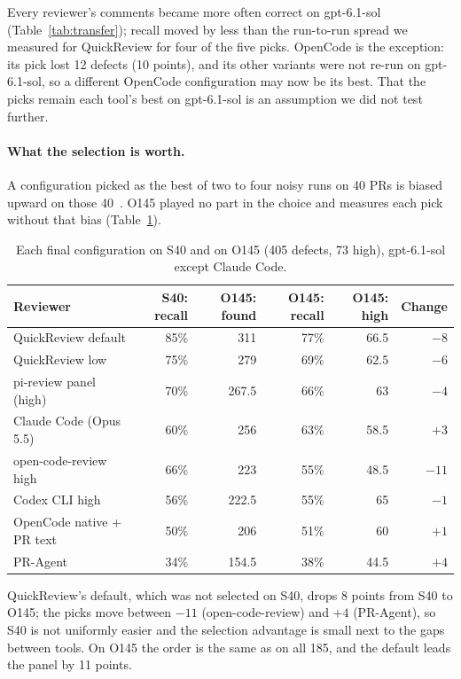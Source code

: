 \documentclass[11pt,a4paper]{article}
\newcommand{\qcr}{QuickReview}
\begin{document}
Every reviewer's comments became more often correct on gpt-6.1-sol
(Table~\ref{tab:transfer}); recall moved by less than the run-to-run spread
we measured for \qcr{} for four of the five picks. OpenCode is the
exception: its pick lost 12 defects (10 points), and its other variants
were not re-run on gpt-6.1-sol, so a different OpenCode configuration may
now be its best. That the picks remain each tool's best on gpt-6.1-sol is
an assumption we did not test further.

\paragraph{What the selection is worth.}
\label{sec:selection}
A configuration picked as the best of two to four noisy runs on 40 PRs is
biased upward on those 40~\cite{cawley2010}. O145 played no part in the
choice and measures each pick without that bias
(Table~\ref{tab:selection}).

\begin{table}[tbp]
  \centering
  \small
  \caption{Each final configuration on S40 and on
  O145 (405 defects, 73 high), gpt-6.1-sol except Claude Code.}
  \label{tab:selection}
  \begin{tabular}{lrrrrr}
    \toprule
    Reviewer & S40: recall & O145: found & O145: recall & O145: high & Change \\
    \midrule
    \qcr{} default & 85\% & 311 & 77\% & 66.5 & $-8$ \\
    \qcr{} low & 75\% & 279 & 69\% & 62.5 & $-6$ \\
    pi-review panel (high) & 70\% & 267.5 & 66\% & 63 & $-4$ \\
    Claude Code (Opus 5.5) & 60\% & 256 & 63\% & 58.5 & $+3$ \\
    open-code-review high & 66\% & 223 & 55\% & 48.5 & $-11$ \\
    Codex CLI high & 56\% & 222.5 & 55\% & 65 & $-1$ \\
    OpenCode native + PR text & 50\% & 206 & 51\% & 60 & $+1$ \\
    PR-Agent & 34\% & 154.5 & 38\% & 44.5 & $+4$ \\
    \bottomrule
  \end{tabular}
\end{table}

\qcr{}'s default, which was not selected on S40, drops 8 points from S40 to
O145; the picks move between $-11$ (open-code-review) and $+4$ (PR-Agent), so
S40 is not uniformly easier and the selection advantage is small next to the
gaps between tools. On O145 the order is the same as on all 185, and the
default leads the panel by 11 points.
\end{document}
